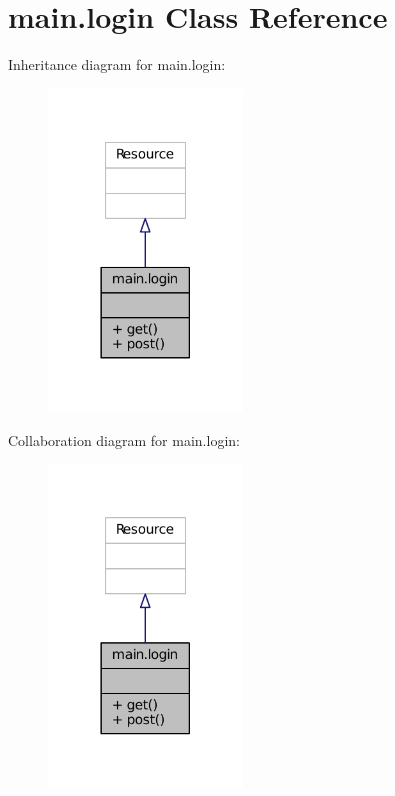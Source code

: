 \hypertarget{classmain_1_1login}{}\section{main.\+login Class Reference}
\label{classmain_1_1login}


Inheritance diagram for main.\+login\+:
\nopagebreak
\begin{figure}[H]
\begin{center}
\leavevmode
\includegraphics[width=146pt]{classmain_1_1login__inherit__graph}
\end{center}
\end{figure}


Collaboration diagram for main.\+login\+:
\nopagebreak
\begin{figure}[H]
\begin{center}
\leavevmode
\includegraphics[width=146pt]{classmain_1_1login__coll__graph}
\end{center}
\end{figure}
